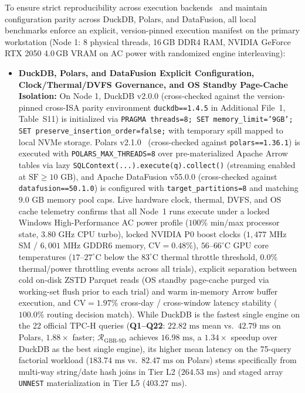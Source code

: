 \documentclass[10pt,a4paper]{article}
\begin{document}
To ensure strict reproducibility across execution backends~\cite{raasveldt2018fair} and maintain configuration parity across DuckDB, Polars, and DataFusion, all local benchmarks enforce an explicit, version-pinned execution manifest on the primary workstation (Node 1: 8 physical threads, 16\,GB DDR4 RAM, NVIDIA GeForce RTX 2050 4.0\,GB VRAM on AC power with randomized engine interleaving):
\begin{itemize}
    \item \textbf{DuckDB, Polars, and DataFusion Explicit Configuration, Clock/Thermal/DVFS Governance, and OS Standby Page-Cache Isolation:} On Node 1, DuckDB v2.0.0 (cross-checked against the version-pinned cross-ISA parity environment \texttt{duckdb==1.4.5} in Additional File~1, Table~S11) is initialized via \texttt{PRAGMA threads=8; SET memory\_limit='9GB'; SET preserve\_insertion\_order=false;} with temporary spill mapped to local NVMe storage. Polars v2.1.0~\cite{vink2024polars} (cross-checked against \texttt{polars==1.36.1}) is executed with \texttt{POLARS\_MAX\_THREADS=8} over pre-materialized Apache Arrow tables via lazy \texttt{SQLContext(...).execute(q).collect()} (streaming enabled at $\text{SF}\ge 10\text{ GB}$), and Apache DataFusion v55.0.0 (cross-checked against \texttt{datafusion==50.1.0}) is configured with \texttt{target\_partitions=8} and matching $9.0\text{ GB}$ memory pool caps. Live hardware clock, thermal, DVFS, and OS cache telemetry confirms that all Node~1 runs execute under a locked Windows High-Performance AC power profile ($100\%$ min/max processor state, $3.80\text{ GHz}$ CPU turbo), locked NVIDIA P0 boost clocks ($1{,}477\text{ MHz}$ SM / $6{,}001\text{ MHz}$ GDDR6 memory, $\text{CV}=0.48\%$), $56\text{--}66^\circ\text{C}$ GPU core temperatures ($17\text{--}27^\circ\text{C}$ below the $83^\circ\text{C}$ thermal throttle threshold, $\mathbf{0.0\%}$ thermal/power throttling events across all trials), explicit separation between cold on-disk ZSTD Parquet reads (OS standby page-cache purged via working-set flush prior to each trial) and warm in-memory Arrow buffer execution, and $\text{CV}=1.97\%$ cross-day / cross-window latency stability ($100.0\%$ routing decision match). While DuckDB is the fastest single engine on the 22 official TPC-H queries (\textbf{Q1--Q22}: $22.82\text{ ms}$ mean vs.\ $42.79\text{ ms}$ on Polars, $1.88\times$ faster; $\mathcal{R}_{\text{GBR-9D}}$ achieves $16.98\text{ ms}$, a $1.34\times$ speedup over DuckDB as the best single engine), its higher mean latency on the 75-query factorial workload ($183.74\text{ ms}$ vs.\ $82.47\text{ ms}$ on Polars) stems specifically from multi-way string/date hash joins in Tier L2 ($264.53\text{ ms}$) and staged array \texttt{UNNEST} materialization in Tier L5 ($403.27\text{ ms}$).

\end{itemize}
\end{document}
